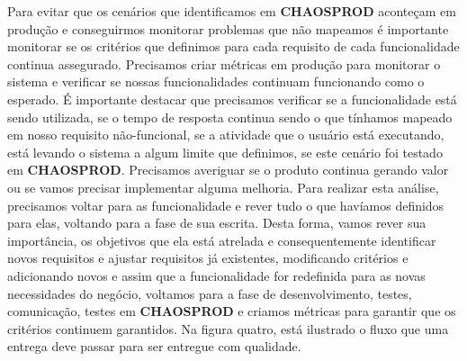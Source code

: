       Para evitar que os cenários que identificamos em \textbf{CHAOSPROD} aconteçam
      em produção e conseguirmos monitorar problemas que não mapeamos é importante
      monitorar se os critérios que definimos para cada requisito de cada funcionalidade
      continua assegurado. Precisamos criar métricas em produção para monitorar
      o sistema e verificar se nossas funcionalidades continuam funcionando como o
      esperado. É importante destacar que precisamos verificar se a funcionalidade
      está sendo utilizada, se o tempo de resposta continua sendo o que tínhamos
      mapeado em nosso requisito não-funcional, se a atividade que o usuário está
      executando, está levando o sistema a algum limite que definimos, se este
      cenário foi testado em \textbf{CHAOSPROD}. Precisamos averiguar se o
      produto continua gerando valor ou se vamos precisar implementar alguma
      melhoria. Para realizar esta análise, precisamos voltar para as funcionalidade
      e rever tudo o que havíamos definidos para elas, voltando para a fase de
      sua escrita. Desta forma, vamos rever sua importância, os objetivos que ela
      está atrelada e consequentemente identificar novos requisitos e ajustar
      requisitos já existentes, modificando critérios e adicionando novos e
      assim que a funcionalidade for redefinida para as novas necessidades do
      negócio, voltamos para a fase de desenvolvimento, testes, comunicação,
      testes em \textbf{CHAOSPROD} e criamos métricas para garantir que
      os critérios continuem garantidos. Na figura quatro, está ilustrado o fluxo
      que uma entrega deve passar para ser entregue com qualidade.

